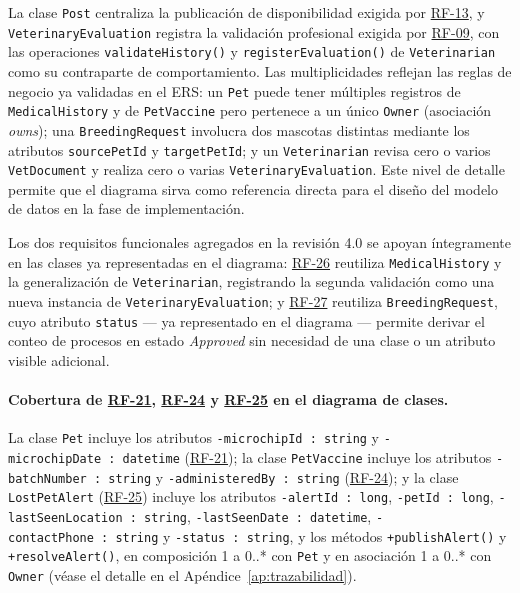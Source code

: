 \documentclass[journal,onecolumn]{IEEEtran}
\begin{document}
	La clase \texttt{Post} centraliza la publicación de disponibilidad
	exigida por \hyperref[tab:RF-13]{RF-13}, y \texttt{VeterinaryEvaluation} registra la validación
	profesional exigida por \hyperref[tab:RF-09]{RF-09}, con las operaciones
	\texttt{validateHistory()} y \texttt{registerEvaluation()} de
	\texttt{Veterinarian} como su contraparte de comportamiento. Las
	multiplicidades reflejan las reglas de negocio ya validadas en el ERS: un
	\texttt{Pet} puede tener múltiples registros de \texttt{MedicalHistory} y
	de \texttt{PetVaccine} pero pertenece a un único \texttt{Owner}
	(asociación \emph{owns}); una \texttt{BreedingRequest} involucra dos
	mascotas distintas mediante los atributos \texttt{sourcePetId} y
	\texttt{targetPetId}; y un \texttt{Veterinarian} revisa cero o varios
	\texttt{VetDocument} y realiza cero o varias \texttt{VeterinaryEvaluation}.
	Este nivel de detalle permite que el diagrama sirva como referencia
	directa para el diseño del modelo de datos en la fase de implementación.

	Los dos requisitos funcionales agregados en la revisión 4.0 se apoyan
	íntegramente en las clases ya representadas en el diagrama: \hyperref[tab:RF-26]{RF-26}
	reutiliza \texttt{MedicalHistory} y la generalización de
	\texttt{Veterinarian}, registrando la segunda validación como una nueva
	instancia de \texttt{VeterinaryEvaluation}; y \hyperref[tab:RF-27]{RF-27} reutiliza
	\texttt{BreedingRequest}, cuyo atributo \texttt{status} --- ya
	representado en el diagrama --- permite derivar el conteo de procesos en
	estado \emph{Approved} sin necesidad de una clase o un atributo visible
	adicional.

	\paragraph{Cobertura de \hyperref[tab:RF-21]{RF-21}, \hyperref[tab:RF-24]{RF-24} y \hyperref[tab:RF-25]{RF-25} en el diagrama de clases.}
	La clase \texttt{Pet} incluye los atributos
	\texttt{-microchipId~:~string} y \texttt{-microchipDate~:~datetime}
	(\hyperref[tab:RF-21]{RF-21}); la clase \texttt{PetVaccine} incluye los atributos
	\texttt{-batchNumber~:~string} y \texttt{-administeredBy~:~string}
	(\hyperref[tab:RF-24]{RF-24}); y la clase \texttt{LostPetAlert}
	(\hyperref[tab:RF-25]{RF-25}) incluye los atributos \texttt{-alertId~:~long},
	\texttt{-petId~:~long}, \texttt{-lastSeenLocation~:~string},
	\texttt{-lastSeenDate~:~datetime}, \texttt{-contactPhone~:~string} y
	\texttt{-status~:~string}, y los métodos \texttt{+publishAlert()} y
	\texttt{+resolveAlert()}, en composición 1 a 0..* con \texttt{Pet} y en
	asociación 1 a 0..* con \texttt{Owner} (véase el detalle en el
	Apéndice~\ref{ap:trazabilidad}).
\end{document}
